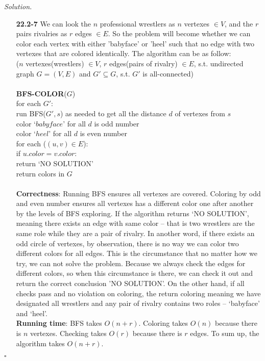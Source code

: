 \documentclass[11pt]{article}
\theoremstyle{definition}
\newenvironment{solution}{\noindent\emph{Solution.}}{\hfill$\square$}
\newcommand\tab[1][1cm]{\hspace*{#1}}
\begin{document}
\begin{solution}
\begin{enumerate}
 \item[\textbf{22.2-7}] \tab We can look the $n$ professional wrestlers as $n$ vertexes $\in V$, and the $r$ pairs rivalries as $r$ edges $\in E$. So the problem will become whether we can color each vertex with either 'babyface' or 'heel' such that no edge with two vertexes that are colored identically. The algorithm can be as follow:\\
  \tab ($n$ vertexes(wrestlers) $\in V$, $r$ edges(pairs of rivalry) $\in E$, s.t. undirected graph $G = (V, E)$ and $G' \subseteq G$, s.t. $G'$ is all-connected)\\ \\
 \textbf{BFS-COLOR}($G$)\\
 for each $G'$:\\
 \tab run BFS($G',s$) as needed to get all the distance $d$ of vertexes from $s$\\
 \tab color `$babyface$' for all $d$ is odd number\\
 \tab color `$heel$' for all $d$ is even number\\
 \tab for each ($(u,v) \in E$):\\
 \tab \tab if $u.color = v.color$:\\
 \tab \tab \tab return `NO SOLUTION'\\
return colors in $G$\\ \\
\tab \textbf{Correctness}: Running BFS ensures all vertexes are covered. Coloring by odd and even number ensures all vertexes has a different color one after another by the levels of BFS exploring. If the algorithm returns `NO SOLUTION', meaning there exists an edge with same color -- that is two wrestlers are the same role while they are a pair of rivalry. In another word, if there exists an odd circle of vertexes, by observation, there is no way we can color two different colors for all edges. This is the circumstance that no matter how we try, we can not solve the problem. Because we always check the edges for different colors, so when this circumstance is there, we can check it out and return the correct conclusion 'NO SOLUTION'. On the other hand, if all checks pass and no violation on coloring, the return coloring meaning we have designated all wrestlers and any pair of rivalry contains two roles -- `babyface' and `heel'.\\
\tab \textbf{Running time}: BFS takes $O(n+r)$. Coloring takes $O(n)$ because there is $n$ vertexes. Checking takes $O(r)$ because there is $r$ edges. To sum up, the algorithm takes $O(n+r)$. 
 
 



    
\end{enumerate}

\end{solution}
\end{document}
